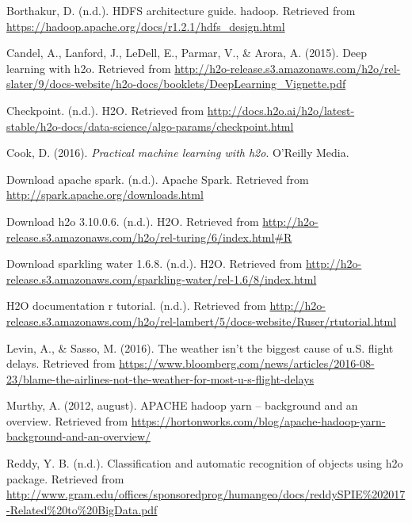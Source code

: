 \documentclass[12pt,twoside]{amherstthesis}
\begin{document}
  \hypertarget{ref-HDFS}{}
  Borthakur, D. (n.d.). HDFS architecture guide. hadoop. Retrieved from
  \url{https://hadoop.apache.org/docs/r1.2.1/hdfs_design.html}
  
  \hypertarget{ref-deepH2Odoc}{}
  Candel, A., Lanford, J., LeDell, E., Parmar, V., \& Arora, A. (2015).
  Deep learning with h2o. Retrieved from
  \url{http://h2o-release.s3.amazonaws.com/h2o/rel-slater/9/docs-website/h2o-docs/booklets/DeepLearning_Vignette.pdf}
  
  \hypertarget{ref-checkpoint}{}
  Checkpoint. (n.d.). H2O. Retrieved from
  \url{http://docs.h2o.ai/h2o/latest-stable/h2o-docs/data-science/algo-params/checkpoint.html}
  
  \hypertarget{ref-h2oBook}{}
  Cook, D. (2016). \emph{Practical machine learning with h2o}. O'Reilly
  Media.
  
  \hypertarget{ref-DownloadSpark}{}
  Download apache spark. (n.d.). Apache Spark. Retrieved from
  \url{http://spark.apache.org/downloads.html}
  
  \hypertarget{ref-H2OInstall}{}
  Download h2o 3.10.0.6. (n.d.). H2O. Retrieved from
  \url{http://h2o-release.s3.amazonaws.com/h2o/rel-turing/6/index.html\#R}
  
  \hypertarget{ref-DownloadSparklingWater}{}
  Download sparkling water 1.6.8. (n.d.). H2O. Retrieved from
  \url{http://h2o-release.s3.amazonaws.com/sparkling-water/rel-1.6/8/index.html}
  
  \hypertarget{ref-h2odocu}{}
  H2O documentation r tutorial. (n.d.). Retrieved from
  \url{http://h2o-release.s3.amazonaws.com/h2o/rel-lambert/5/docs-website/Ruser/rtutorial.html}
  
  \hypertarget{ref-weatherDelayNews}{}
  Levin, A., \& Sasso, M. (2016). The weather isn't the biggest cause of
  u.S. flight delays. Retrieved from
  \url{https://www.bloomberg.com/news/articles/2016-08-23/blame-the-airlines-not-the-weather-for-most-u-s-flight-delays}
  
  \hypertarget{ref-hortonApache}{}
  Murthy, A. (2012, august). APACHE hadoop yarn -- background and an
  overview. Retrieved from
  \url{https://hortonworks.com/blog/apache-hadoop-yarn-background-and-an-overview/}
  
  \hypertarget{ref-DeepFeedForward}{}
  Reddy, Y. B. (n.d.). Classification and automatic recognition of objects
  using h2o package. Retrieved from
  \url{http://www.gram.edu/offices/sponsoredprog/humangeo/docs/reddySPIE\%202017-Related\%20to\%20BigData.pdf}
  
\end{document}
